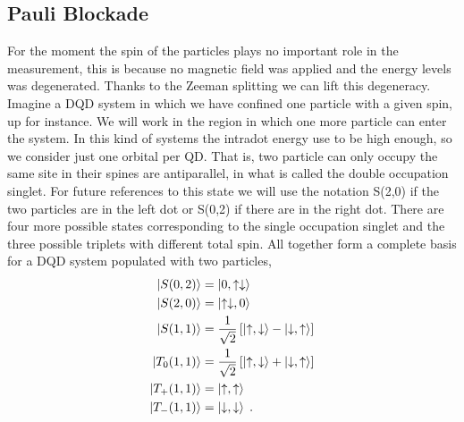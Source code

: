 \subsection{Pauli Blockade}
For the moment the spin of the particles plays no important role in the measurement, this is because no magnetic field was applied and the energy levels was degenerated. Thanks to the Zeeman splitting we can lift this degeneracy. Imagine a DQD system in which we have confined one particle with a given spin, up for instance. We will work in the region in which one more particle can enter the system. In this kind of systems the intradot energy use to be high enough, so we consider just one orbital per QD. That is, two particle can only occupy the same site in their spines are antiparallel, in what is called the double occupation singlet. For future references to this state we will use the notation S(2,0) if the two particles are in the left dot or S(0,2) if there are in the right dot. There are four more possible states corresponding to the single occupation singlet and the three possible triplets with different total spin. All together form a complete basis for a DQD system populated with two particles,
\begin{equation}
	\begin{split}
	\ket{S(0,2)}&=\ket{0,\uparrow\downarrow}\\
	\ket{S(2,0)}&=\ket{\uparrow\downarrow,0}\\
	\ket{S(1,1)}&=\frac{1}{\sqrt{2}}\left[\ket{\uparrow,\downarrow}-\ket{\downarrow,\uparrow}\right]\\
	\ket{T_0(1,1)}&=\frac{1}{\sqrt{2}}\left[\ket{\uparrow,\downarrow}+\ket{\downarrow,\uparrow}\right]\\
	\ket{T_+(1,1)}&=\ket{\uparrow,\uparrow}\\
	\ket{T_-(1,1)}&=\ket{\downarrow,\downarrow}\;.
	\end{split}
	\label{eq:molecular_basis}
\end{equation}
